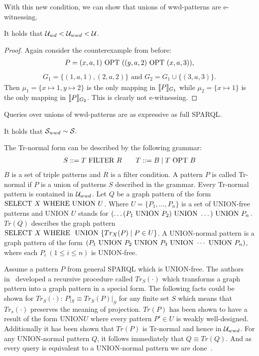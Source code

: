 With this new condition, we can show that unions of wwd-patterns are
e-witnessing. 

\begin{theorem}
	It holds that $\mathcal{U}_{wd} < \mathcal{U}_{wwd} < \mathcal{U}$.
\end{theorem}
\begin{proof}
	Again consider the counterexample from before:	
	\begin{align*}
		P = (x, a, 1) \mbox{ OPT } ((y,a,2) \mbox{ OPT }(x,a,3)),
	\end{align*}
	\begin{align*}
		G_1 = \{(1,a,1),(2,a,2)\} \mbox{ and } G_2 = G_1 \cup \{(3,a,3)\}.
	\end{align*}
	Then $\mu_1 = \{x \mapsto 1, y \mapsto 2\}$ is the only mapping in $\llbracket
	P\rrbracket_{G_1}$ while $\mu_2 = \{x \mapsto 1\}$ is the only mapping in $\llbracket P
	\rrbracket_{G_2}$.
	This is clearly not e-witnessing.
\end{proof}
Queries over unions of wwd-patterns are as expressive as full SPARQL.
\begin{theorem}
	It holds that $\mathcal{S}_{wwd} \sim \mathcal{S}.$
\end{theorem}
\begin{proofidea}
The Tr-normal form can be described by the following grammar:
\begin{align*}
	S::= T \mbox{ FILTER } R  \qquad T::= B \mid T \mbox{ OPT } B
\end{align*}
$B$ is a set of triple patterns and $R$ is a filter condition.
A pattern $P$ is called Tr-normal if $P$ is a union of patterns $S$ described
in the grammar. Every Tr-normal pattern is contained in $\mathcal{U}_{wwd}$.
Let $Q$ be a graph pattern of the form\\ $\mbox{SELECT } X \mbox{ WHERE} \mbox{ UNION } U$. Where
$U=\{P_1,\dots,P_n\}$ is a set of UNION-free patterns and UNION $U$ stands for
$(\dots (P_1 \mbox{ UNION } P_2) \mbox{ UNION } \dots )  \mbox{ UNION } P_n$.
$Tr(Q)$ describes the graph pattern $\mbox{SELECT } X \mbox{ WHERE } \mbox{ UNION } \{Tr_X(P) \mid
P \in U\}$. A UNION-normal pattern is a graph pattern of the form 
$(P_1 \mbox{ UNION } P_2 \mbox{ UNION } P_3 \\ \mbox{ UNION } \cdots \mbox{ UNION } P_n)$, where each $P_i \ (1\leq i
\leq n)$ is UNION-free.

Assume a pattern $P$ from general SPARQL which is UNION-free. The authors
in~\cite{kaminski_bwd} developed a recursive procedure called $Tr_S(\cdot)$
which transforms a graph pattern into a graph pattern in a special form.
The following facts could be shown for $Tr_S(\cdot)$:
$P|_S \equiv Tr_S(P)|_S$ for any finite set $S$ which means that $Tr_s(\cdot)$
preserves the meaning of projection. $Tr(P)$ has been
shown to have a result of the form $\mbox{UNION} U$ where every pattern $P' \in U$ is weakly well-designed.
Additionally it has been shown that $Tr(P)$ is Tr-normal and hence in $\mathcal{U}_{wwd}$.
For any UNION-normal pattern $Q$, it follows immediately that $Q \equiv Tr(Q)$. And as
every query is equivalent to a UNION-normal pattern we are
done~\cite{perez2009semantics}.






\end{proofidea}

